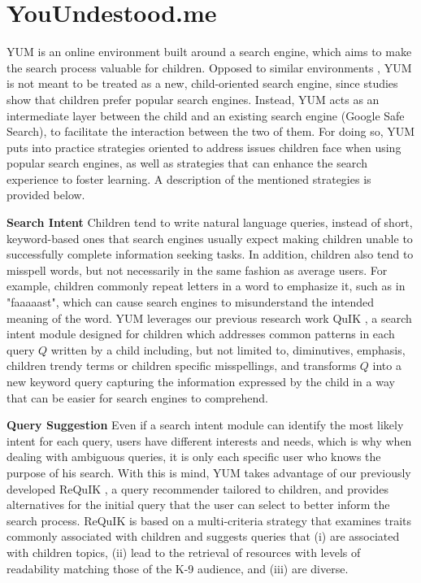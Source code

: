 \documentclass{sig-alternate-05-2015}
\begin{document}
\section{YouUndestood.me}
\label{sec:method}
YUM is an online environment built around a search engine, which aims to make the search process valuable for children. Opposed to similar environments \cite{Ust14}, YUM is not meant to be treated as a new, child-oriented search engine, since studies \cite{Bil13} show that children prefer popular search engines. Instead, YUM acts as an intermediate layer between the child and an existing search engine (Google Safe Search), to facilitate the interaction between the two of them. For doing so, YUM puts into practice strategies oriented to address issues children face when using popular search engines, as well as strategies that can enhance the search experience to foster learning.  A description of the mentioned strategies is provided below.

\noindent
\textbf{Search Intent} Children tend to write natural language queries, instead of short, keyword-based ones that search engines usually expect \cite{Rie16} making children unable to successfully complete information seeking tasks. In addition, children also tend to misspell words, but not necessarily in the same fashion as average users. For example, children commonly repeat letters in a word to emphasize it, such as in "faaaaast", which can cause search engines to misunderstand the intended meaning of the word. YUM leverages our previous research work QuIK \cite{Quik}, a search intent module designed  for children which addresses common patterns in each query $Q$ written by a child including, but not limited to, diminutives, emphasis, children trendy terms or children specific misspellings, and transforms $Q$ into a new keyword query capturing the information expressed by the child in a way that can be easier for search engines to comprehend.

\noindent
\textbf{Query Suggestion} Even if a search intent module can identify the most likely intent for each query, users have different interests and needs, which is why when dealing with ambiguous queries, it is only each specific user who knows the purpose of his search. With this is mind,  YUM takes advantage of our previously developed ReQuIK \cite{Requik}, a query recommender tailored to children, and provides alternatives for the initial query that the user can select to better inform the search process. ReQuIK is based on a multi-criteria strategy that examines  traits commonly associated with children and suggests queries that (i) are associated with children topics, (ii) lead to the retrieval of resources with levels of readability matching those of the K-9 audience, and (iii) are diverse.
\end{document}
